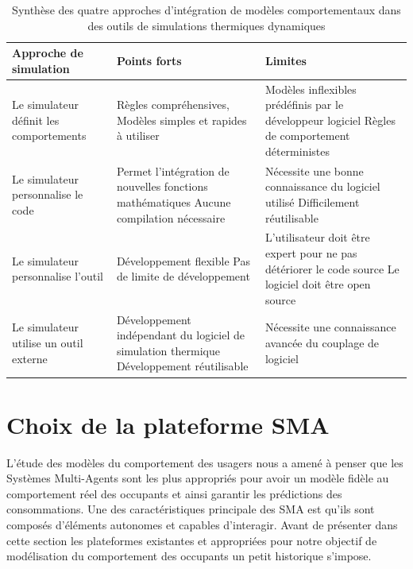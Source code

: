 \begin{table}
\centering
\begin{tabular}{|p{4.5cm}||p{5cm}|p{5cm}|}
\hline Approche de simulation & Points forts & Limites \\
\hline
\hline Le simulateur définit les comportements & Règles compréhensives, \newline Modèles simples et rapides à utiliser & Modèles inflexibles prédéfinis par le développeur logiciel \newline Règles de comportement déterministes \\
\hline Le simulateur personnalise le code & Permet l'intégration de nouvelles fonctions mathématiques \newline Aucune compilation nécessaire & Nécessite une bonne connaissance du logiciel utilisé \newline Difficilement réutilisable \\
\hline Le simulateur personnalise l'outil & Développement flexible \newline Pas de limite de développement & L'utilisateur doit être expert pour ne pas détériorer le code source \newline Le logiciel doit être open source \\
\hline Le simulateur utilise un outil externe & Développement indépendant du logiciel de simulation thermique \newline Développement réutilisable  & Nécessite une connaissance avancée du couplage de logiciel \\
\hline
\end{tabular}
\caption{Synthèse des quatre approches d'intégration de modèles comportementaux dans des outils de simulations thermiques dynamiques}
\label{synthese intégration}
\end{table}

\section{Choix de la plateforme SMA}

L'étude des modèles du comportement des usagers nous a amené à penser que les Systèmes Multi-Agents sont les plus appropriés pour avoir un modèle fidèle au comportement réel des occupants et ainsi garantir les prédictions des consommations. Une des caractéristiques principale des SMA est qu'ils sont composés d'éléments autonomes et capables d'interagir. Avant de présenter dans cette section les plateformes existantes et appropriées pour notre objectif de modélisation du comportement des occupants un petit historique s'impose.

